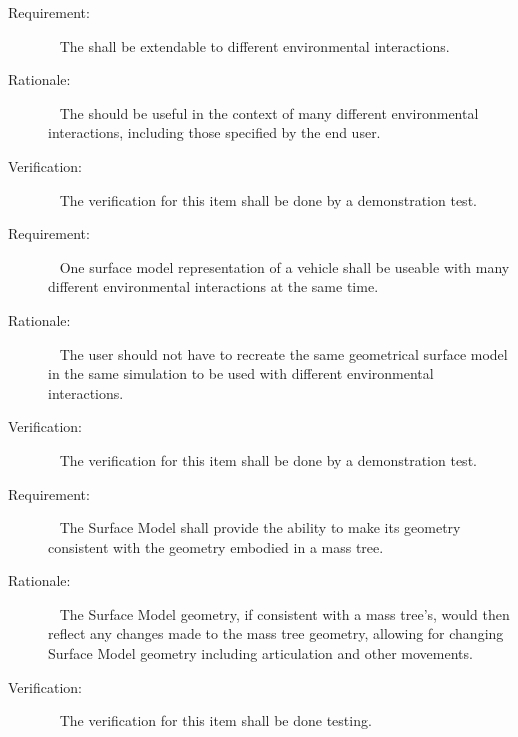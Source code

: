  \label{reqt:surfacemodel_interaction_extension}
 \begin{description}
 \item[Requirement:]\ \newline
 The \ModelDesc shall be extendable to different environmental
 interactions.
 \item[Rationale:]\ \newline
 The \ModelDesc should be useful in the context of many different
 environmental interactions, including those specified by the end user.
 \item[Verification:]\ \newline
 The verification for this item shall be done by a demonstration test.
 \end{description}

 \label{reqt:surfacemodel_surface_reuse}
 \begin{description}
 \item[Requirement:]\ \newline
 One surface model representation of a vehicle shall be useable with
 many different environmental interactions at the same time.
 \item[Rationale:]\ \newline
 The user should not have to recreate the same geometrical surface model
 in the same simulation to be used with different environmental
 interactions.
 \item[Verification:]\ \newline
 The verification for this item shall be done by a demonstration test.
 \end{description}

 \label{reqt:surfacemodel_artic}
 \begin{description}
 \item[Requirement:]\ \newline
 The Surface Model shall provide the ability to make its
geometry consistent with the geometry embodied in a mass tree.
 \item[Rationale:]\ \newline
 The Surface Model geometry, if consistent with a mass tree's, would then
 reflect any changes made to the mass tree geometry, allowing for
 changing Surface Model geometry including articulation and other
 movements.
 \item[Verification:]\ \newline
 The verification for this item shall be done testing.
 \end{description}

